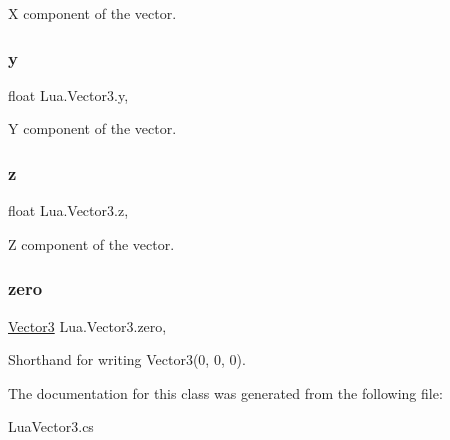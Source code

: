 X component of the vector. 

\mbox{\label{class_lua_1_1_vector3_a93844cc4b95c4b4cc2152ecd3d6a69ed}} 
\subsubsection{\texorpdfstring{y}{y}}
{\footnotesize\ttfamily float Lua.\+Vector3.\+y\hspace{0.3cm}{\ttfamily [get]}, {\ttfamily [set]}}



Y component of the vector. 

\mbox{\label{class_lua_1_1_vector3_a80737d9f0e18357fd716e47a1b82ef6a}} 
\subsubsection{\texorpdfstring{z}{z}}
{\footnotesize\ttfamily float Lua.\+Vector3.\+z\hspace{0.3cm}{\ttfamily [get]}, {\ttfamily [set]}}



Z component of the vector. 

\mbox{\label{class_lua_1_1_vector3_aa45f0524375ebdaeb4244325ffb08210}} 
\subsubsection{\texorpdfstring{zero}{zero}}
{\footnotesize\ttfamily \mbox{\hyperlink{class_lua_1_1_vector3}{Vector3}} Lua.\+Vector3.\+zero\hspace{0.3cm}{\ttfamily [static]}, {\ttfamily [get]}}



Shorthand for writing Vector3(0, 0, 0). 



The documentation for this class was generated from the following file\+:\begin{DoxyCompactItemize}
\item 
Lua\+Vector3.\+cs\end{DoxyCompactItemize}
